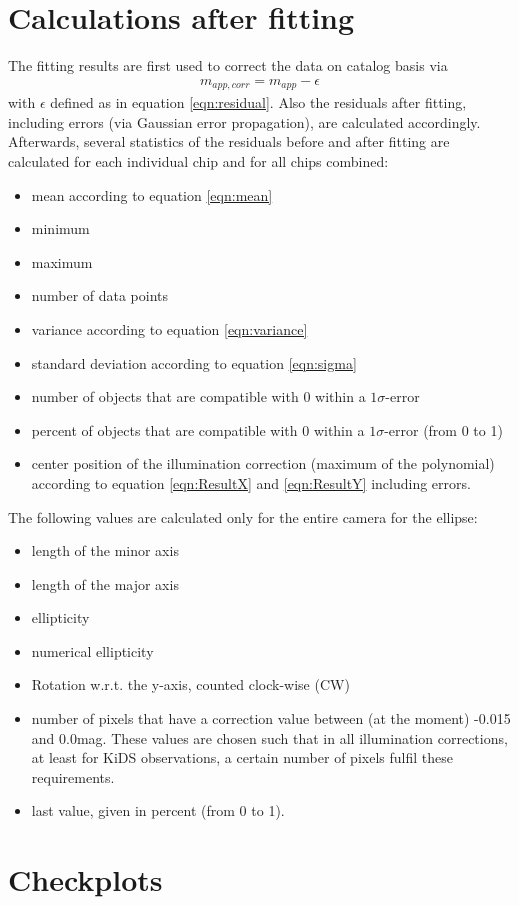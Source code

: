 \section{Calculations after fitting}
\label{sec:IllumCorrectionCalcsAfterFitting}
The fitting results are first used to correct the data on catalog basis via
\begin{eqnarray}
m_{app,corr} = m_{app} - \epsilon
\end{eqnarray}
with $\epsilon$ defined as in equation \ref{eqn:residual}. Also the residuals after fitting, including errors (via Gaussian error propagation), are calculated accordingly.\\
Afterwards, several statistics of the residuals before and after fitting are calculated for each individual chip and for all chips combined:
\begin{itemize}
\item mean according to equation \ref{eqn:mean}
\item minimum
\item maximum
\item number of data points
\item variance according to equation \ref{eqn:variance}
\item standard deviation according to equation \ref{eqn:sigma}
\item number of objects that are compatible with 0 within a $1\sigma$-error
\item percent of objects that are compatible with 0 within a $1\sigma$-error (from 0 to 1)
\item center position of the illumination correction (maximum of the polynomial) according to equation \ref{eqn:ResultX} and \ref{eqn:ResultY} including errors.
\end{itemize}
The following values are calculated only for the entire camera for the ellipse:
\begin{itemize}
\item length of the minor axis
\item length of the major axis
\item ellipticity
\item numerical ellipticity
\item Rotation w.r.t. the y-axis, counted clock-wise (CW)
\item number of pixels that have a correction value between (at the moment) -0.015 and 0.0mag. These values are chosen such that in all illumination corrections, at least for KiDS observations, a certain number of pixels fulfil these requirements.
\item last value, given in percent (from 0 to 1).
\end{itemize}



\section{Checkplots}
\label{sec:IllumCorrectionCheckplots}
